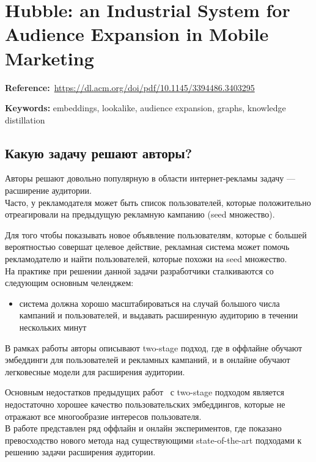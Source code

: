 \chapter{Hubble: an Industrial System for Audience Expansion in Mobile Marketing}

\textbf{Reference:}~\url{https://dl.acm.org/doi/pdf/10.1145/3394486.3403295}

\textbf{Keywords:} embeddings, lookalike, audience expansion, graphs, knowledge distillation

\section*{Какую задачу решают авторы?}

Авторы решают довольно популярную в области интернет-рекламы задачу --- расширение аудитории. \\

Часто, у рекламодателя может быть список пользователей, которые положительно отреагировали на предыдущую рекламную кампанию (seed множество).

Для того чтобы показывать новое объявление пользователям, которые с большей вероятностью совершат целевое действие, рекламная система может помочь рекламодателю и найти пользователей, которые похожи на seed множество. \\

На практике при решении данной задачи разработчики сталкиваются со следующим основным челенджем:

\begin{itemize}
    \item система должна хорошо масштабироваться на случай большого числа кампаний и пользователей, и выдавать расширенную аудиторию в течении нескольких минут
\end{itemize}

В рамках работы авторы описывают two-stage подход, где в оффлайне обучают эмбеддинги для пользователей и рекламных кампаний, и в онлайне обучают легковесные модели для расширения аудитории. 

Основным недостатков предыдущих работ~\cite{dewet2019finding,liu2019real} с two-stage подходом является недостаточно хорошее качество пользовательских эмбеддингов, которые не отражают все многообразие интересов пользователя. \\

В работе представлен ряд оффлайн и онлайн экспериментов, где показано превосходство нового метода над существующими state-of-the-art подходами к решению задачи расширения аудитории.

